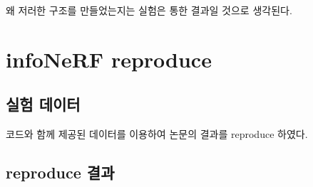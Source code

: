 \documentclass{vipweekly}
\begin{document}

왜 저러한 구조를 만들었는지는 실험은 통한 결과일 것으로 생각된다. 


\section{infoNeRF\cite{infonerf} reproduce}

\subsection{실험 데이터} 

코드와 함께 제공된 데이터를 이용하여 논문의 결과를 reproduce 하였다. 

\subsection{reproduce 결과}
\end{document}

